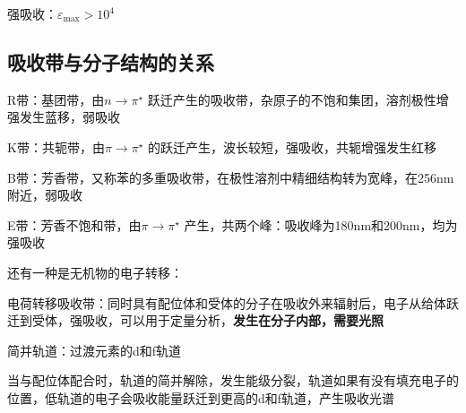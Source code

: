 强吸收：$\varepsilon_\text{max}>10^{4}$
\subsection{吸收带与分子结构的关系}%
\label{sub:吸收带与分子结构的关系}
\begin{defi}
    R带：基团带，由$n\to \pi^\star $ 跃迁产生的吸收带，杂原子的不饱和集团，溶剂极性增强发生蓝移，弱吸收

    K带：共轭带，由$\pi \to \pi ^\star $ 的跃迁产生，波长较短，强吸收，共轭增强发生红移

    B带：芳香带，又称苯的多重吸收带，在极性溶剂中精细结构转为宽峰，在256nm附近，弱吸收

    E带：芳香不饱和带，由$\pi \to \pi ^\star $ 产生，共两个峰：吸收峰为180nm和200nm，均为强吸收
\end{defi}
还有一种是无机物的电子转移：
\begin{notation}
    电荷转移吸收带：同时具有配位体和受体的分子在吸收外来辐射后，电子从给体跃迁到受体，强吸收，可以用于定量分析，\textbf{发生在分子内部，需要光照}
\end{notation}
\begin{defi}
    简并轨道：过渡元素的d和f轨道
\end{defi}
当与配位体配合时，轨道的简并解除，发生能级分裂，轨道如果有没有填充电子的位置，低轨道的电子会吸收能量跃迁到更高的d和f轨道，产生吸收光谱
